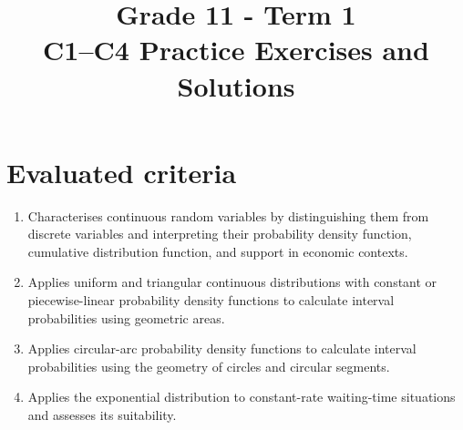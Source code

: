 \makeatletter
{}
\makeatother







\title{Grade 11 - Term 1 \\ C1--C4 Practice Exercises and Solutions}
\author{}
\date{}

\newcommand{\SolvedGraph}[2]{%
	\par\smallskip
	\Needspace{4.6cm}%
	\noindent
	\begin{center}
		\textbf{\small #1}\par\vspace{-1mm}
		#2
	\end{center}
	\vspace{-2mm}%
}


\newcommand{\SolutionStage}[2]{%
	\Needspace{6\baselineskip}%
	\subsection{#2}%
}


	\maketitle
	\vspace{-2cm}
	\setcounter{tocdepth}{1}
	\setcounter{secnumdepth}{2}
	\label{toc}
	\tableofcontents
	
	\section*{Evaluated criteria}
	\begin{enumerate}[label=\textbf{C\arabic*}]
		\item Characterises continuous random variables by distinguishing them from discrete variables and interpreting their probability density function, cumulative distribution function, and support in economic contexts.
		\item Applies uniform and triangular continuous distributions with constant or piecewise-linear probability density functions to calculate interval probabilities using geometric areas.
		\item Applies circular-arc probability density functions to calculate interval probabilities using the geometry of circles and circular segments.
		\item Applies the exponential distribution to constant-rate waiting-time situations and assesses its suitability.
	\end{enumerate}
	
